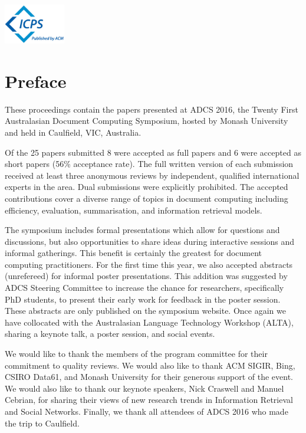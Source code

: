 \documentclass[a4paper]{article}
\begin{document}
\vspace{1in}

\hfill\includegraphics[width=0.2\textwidth]{icps-logo-plain}

\newpage

\section*{Preface}

These proceedings contain the papers presented at ADCS 2016, the Twenty First 
Australasian Document Computing Symposium, hosted by Monash University
and held in Caulfield, VIC, Australia.

Of the 25 papers submitted 8 were accepted as full papers and 6 were accepted
as short papers (56\% acceptance rate).  The  full  written  version  of each submission received at
least three anonymous reviews by independent, qualified international experts
in the area. Dual submissions were explicitly prohibited.  The accepted
contributions cover a diverse range of topics in document computing including
efficiency, evaluation, summarisation, and information retrieval
models.

The symposium includes formal presentations which allow for questions and
discussions, but also opportunities to share ideas during interactive sessions
and informal gatherings. This benefit is certainly the greatest for document
computing practitioners. For the first time this year, we also accepted abstracts (unrefereed) for
informal poster presentations. This addition was suggested by ADCS Steering
Committee to increase the chance for researchers, specifically PhD students, to
present their early work for feedback in the poster session. These abstracts are
only published on the symposium website. Once again we have collocated with the
Australasian Language Technology Workshop (ALTA), sharing a keynote  talk, a
poster session, and social events.

We would like to thank the members of the program committee for their
commitment to quality reviews. We would also like to thank ACM SIGIR, Bing,
CSIRO Data61, and Monash University for their generous support of the event. We
would also like to thank our keynote speakers, Nick Craswell and Manuel
Cebrian, for sharing their views of new research trends in Information
Retrieval and Social Networks. Finally, we thank all attendees of ADCS 2016 who
made the trip to Caulfield.
\end{document}
